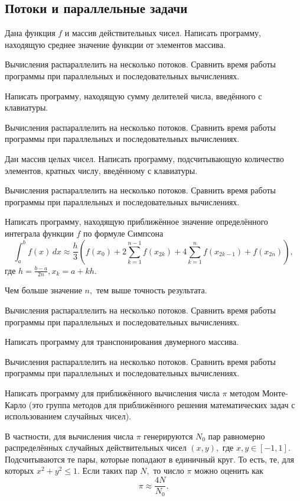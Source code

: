 
\subsection{Потоки и параллельные задачи}

\task Дана функция $f$ и массив действительных чисел. Написать
программу, находящую среднее значение функции от элементов
массива.

Вычисления распараллелить на несколько потоков. Сравнить время работы
программы при параллельных и последовательных вычислениях.

\task Написать программу, находящую сумму делителей числа, введённого
с клавиатуры.

Вычисления распараллелить на несколько потоков. Сравнить время работы
программы при параллельных и последовательных вычислениях.

\task Дан массив целых чисел. Написать программу, подсчитывающую
количество элементов, кратных числу, введённому с клавиатуры.

Вычисления распараллелить на несколько потоков. Сравнить время работы
программы при параллельных и последовательных вычислениях.

\task Написать программу, находящую приближённое значение
определённого интеграла функции $f$ по формуле
Симпсона
\[
\int_a^b f(x)\,dx \approx \frac{h}3 \left(
  f(x_0) + 2\sum_{k=1}^{n-1} f(x_{2k}) + 4\sum_{k=1}^n f(x_{2k-1}) + f(x_{2n})
\right),
\]
где $h = \frac{b-a}{2n}, x_k=a+kh.$ 

Чем больше значение $n,$ тем выше точность результата.

Вычисления распараллелить на несколько потоков. Сравнить время работы
программы при параллельных и последовательных вычислениях.

\task Написать программу для транспонирования двумерного массива.

Вычисления распараллелить на несколько потоков. Сравнить время работы
программы при параллельных и последовательных вычислениях.

\task Написать программу для приближённого вычисления числа $\pi$
методом Монте-Карло (это группа методов для
приближённого решения математических задач с использованием случайных
чисел).

В частности, для вычисления числа $\pi$ генерируются $N_0$ пар
равномерно распределённых случайных действительных чисел
$(x, y),$ где $x, y \in [-1, 1].$ Подсчитываются те пары, которые попадают в
единичный круг. То есть, те, для которых $x^2+y^2 \leqslant 1.$ Если
таких пар $N,$ то число $\pi$ можно оценить как
\[
\pi \approx \frac{4N}{N_0}.
\]

